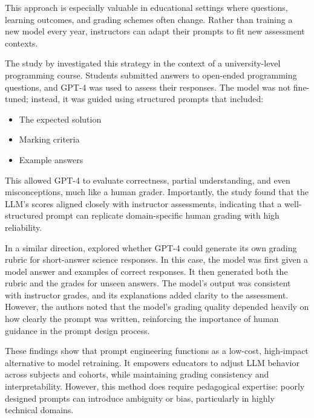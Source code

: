 This approach is especially valuable in educational settings where questions, learning outcomes, and grading schemes often change. Rather than training a new model every year, instructors can adapt their prompts to fit new assessment contexts.

The study by \citet{bengtsson2024} investigated this strategy in the context of a university-level programming course. Students submitted answers to open-ended programming questions, and GPT-4 was used to assess their responses. The model was not fine-tuned; instead, it was guided using structured prompts that included:

\begin{itemize}
  \item The expected solution
  \item Marking criteria
  \item Example answers
\end{itemize}

This allowed GPT-4 to evaluate correctness, partial understanding, and even misconceptions, much like a human grader. Importantly, the study found that the LLM's scores aligned closely with instructor assessments, indicating that a well-structured prompt can replicate domain-specific human grading with high reliability.

In a similar direction, \citet{impey2024} explored whether GPT-4 could generate its own grading rubric for short-answer science responses. In this case, the model was first given a model answer and examples of correct responses. It then generated both the rubric and the grades for unseen answers. The model's output was consistent with instructor grades, and its explanations added clarity to the assessment. However, the authors noted that the model's grading quality depended heavily on how clearly the prompt was written, reinforcing the importance of human guidance in the prompt design process.

These findings show that prompt engineering functions as a low-cost, high-impact alternative to model retraining. It empowers educators to adjust LLM behavior across subjects and cohorts, while maintaining grading consistency and interpretability. However, this method does require pedagogical expertise: poorly designed prompts can introduce ambiguity or bias, particularly in highly technical domains.

